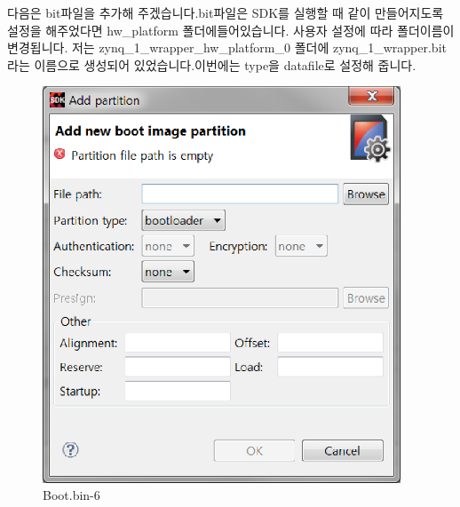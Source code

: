 \documentclass[11pt
  , a4paper
  , article
  , oneside
]{memoir}
\begin{document}
다음은 bit파일을 추가해 주겠습니다.bit파일은 SDK를 실행할 때 같이 만들어지도록 설정을 해주었다면 hw\_platform 폴더에들어있습니다.
사용자 설정에 따라 폴더이름이 변경됩니다. 저는 zynq\_1\_wrapper\_hw\_platform\_0 폴더에 zynq\_1\_wrapper.bit라는 이름으로 생성되어 있었습니다.이번에는 type을 datafile로 설정해 줍니다.

\begin{figure}[h!]
	\centering
	\includegraphics[width=0.95\textwidth]{./images/boot_bin_7.eps}
	\caption{Boot.bin-6}
	\label{fig:boot.bin.6} 
\end{figure}
\end{document}
